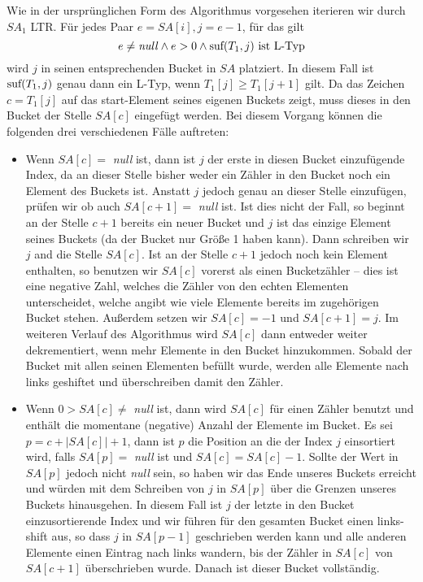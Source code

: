 Wie in der ursprünglichen Form des Algorithmus vorgesehen iterieren wir durch $SA_1$ LTR. Für jedes Paar $e = SA[i], j = e -1$, für das gilt
\[
	e \neq \text{\textit{null}} \wedge e > 0  \wedge \text{suf}(T_1,j) \text{ ist L-Typ} 
\]
wird $j$ in seinen entsprechenden Bucket in $SA$ platziert. In diesem Fall ist $\text{suf}(T_1,j)$ genau dann ein L-Typ, wenn $T_1[j] \geq T_1[j+1]$ gilt. Da das Zeichen $c = T_1[j]$ auf das start-Element seines eigenen Buckets zeigt, muss dieses in den Bucket der Stelle $SA[c]$ eingefügt werden. Bei diesem Vorgang können die folgenden drei verschiedenen Fälle auftreten:

\begin{itemize}
\item Wenn $SA[c] = $ \textit{null} ist, dann ist $j$ der erste in diesen Bucket einzufügende Index, da an dieser Stelle bisher weder ein Zähler in den Bucket noch ein Element des Buckets ist. Anstatt $j$ jedoch genau an dieser Stelle einzufügen, prüfen wir ob auch $SA[c+1]  = $ \textit{null} ist. Ist dies nicht der Fall, so beginnt an der Stelle $c+1$ bereits ein neuer Bucket und $j$ ist das einzige Element seines Buckets (da der Bucket nur Größe 1 haben kann). Dann schreiben wir $j$ and die Stelle $SA[c]$. Ist an der Stelle $c+1$ jedoch noch kein Element enthalten, so benutzen wir $SA[c]$ vorerst als einen Bucketzähler -- dies ist eine negative Zahl, welches die Zähler von den echten Elementen unterscheidet, welche angibt wie viele Elemente bereits im zugehörigen Bucket stehen. Außerdem setzen wir $SA[c] = -1$ und $SA[c+1] = j$. Im weiteren Verlauf des Algorithmus wird $SA[c]$ dann entweder weiter dekrementiert, wenn mehr Elemente in den Bucket hinzukommen. Sobald der Bucket mit allen seinen Elementen befüllt wurde, werden alle Elemente nach links geshiftet und überschreiben damit den Zähler.

\item Wenn $ 0 > SA[c] \neq$ \textit{null} ist, dann wird $SA[c]$ für einen Zähler benutzt und enthält die momentane (negative) Anzahl der Elemente im Bucket. Es sei $p = c + |SA[c]| + 1$, dann ist $p$ die Position an die der Index $j$ einsortiert wird, falls $SA[p] = $ \textit{null} ist und $SA[c] = SA[c] - 1$. Sollte der Wert in $SA[p]$ jedoch nicht \textit{null} sein, so haben wir das Ende unseres Buckets erreicht und würden mit dem Schreiben von $j$ in $SA[p]$ über die Grenzen unseres Buckets hinausgehen. In diesem Fall ist $j$ der letzte in den Bucket einzusortierende Index und wir führen für den gesamten Bucket einen links-shift aus, so dass $j$ in $SA[p-1]$ geschrieben werden kann und alle anderen Elemente einen Eintrag nach links wandern, bis der Zähler in $SA[c]$ von $SA[c+1]$ überschrieben wurde. Danach ist dieser Bucket vollständig.


\end{itemize}
